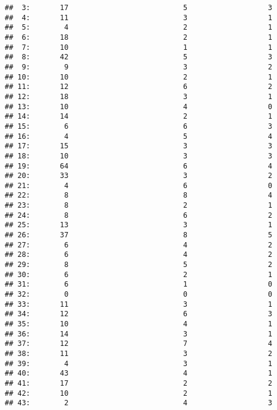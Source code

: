 \documentclass[
]{article}
\begin{document}
\begin{verbatim}
##  3:       17                           5                   3
##  4:       11                           3                   1
##  5:        4                           2                   1
##  6:       18                           2                   1
##  7:       10                           1                   1
##  8:       42                           5                   3
##  9:        9                           3                   2
## 10:       10                           2                   1
## 11:       12                           6                   2
## 12:       18                           3                   1
## 13:       10                           4                   0
## 14:       14                           2                   1
## 15:        6                           6                   3
## 16:        4                           5                   4
## 17:       15                           3                   3
## 18:       10                           3                   3
## 19:       64                           6                   4
## 20:       33                           3                   2
## 21:        4                           6                   0
## 22:        8                           8                   4
## 23:        8                           2                   1
## 24:        8                           6                   2
## 25:       13                           3                   1
## 26:       37                           8                   5
## 27:        6                           4                   2
## 28:        6                           4                   2
## 29:        8                           5                   2
## 30:        6                           2                   1
## 31:        6                           1                   0
## 32:        0                           0                   0
## 33:       11                           3                   1
## 34:       12                           6                   3
## 35:       10                           4                   1
## 36:       14                           3                   1
## 37:       12                           7                   4
## 38:       11                           3                   2
## 39:        4                           3                   1
## 40:       43                           4                   1
## 41:       17                           2                   2
## 42:       10                           2                   1
## 43:        2                           4                   3

\end{verbatim}
\end{document}
